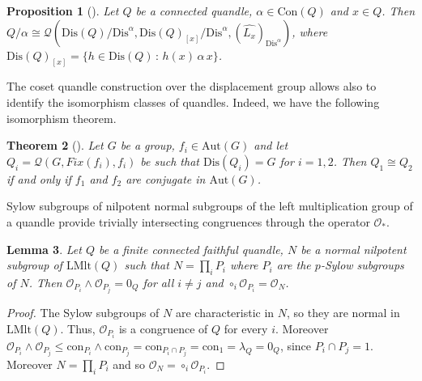 \documentclass[a4paper, english, 9pt]{amsart}
\theoremstyle{plain}
\newtheorem{theorem}{Theorem}[section]
\newtheorem{lemma}[theorem]{Lemma}
\newtheorem{proposition}[theorem]{Proposition}
\theoremstyle{definition}
\def\aut#1{\mathrm{Aut}(#1)}
\def\lmlt{\mathrm{LMlt}}
\def\dis{\mathrm{Dis}}
\def\con{\mathrm{Con}}
\def\c#1{\mathrm{con}_{#1}}
\def\setof#1#2{\{#1\,\colon\,#2\}}
\begin{document}
\begin{proposition}[]
    Let $Q$ be a connected quandle, $\alpha\in \con(Q)$ and $x\in Q$. Then $Q/\alpha\cong \mathcal{Q}(\dis(Q)/\dis^\alpha,\dis(Q)_{[x]}/\dis^\alpha ,\left(\widehat{L_x}\right)_{\dis^\alpha})$, where $\dis(Q)_{[x]}=\setof{h\in \dis(Q)}{h(x)\, \alpha\, x}$.
\end{proposition}


The coset quandle construction over the displacement group allows also to identify the isomorphism classes of quandles. Indeed, we have the following isomorphism theorem. 
\begin{theorem}[] \label{iso theo}
    Let $G$ be a group, $f_i\in \aut{G}$ and let $Q_i=\mathcal{Q}(G,Fix(f_i),f_i)$ be such that $\dis(Q_i)=G$ for $i=1,2$. Then $Q_1\cong Q_2$ if and only if $f_1$ and $f_2$ are conjugate in $\aut{G}$.
\end{theorem}



Sylow subgroups of nilpotent normal subgroups of the left multiplication group of a quandle provide trivially intersecting congruences through the operator $\mathcal{O}_*$.
\begin{lemma}\label{Sylow}
    Let $Q$ be a finite connected faithful quandle, $N$ be a normal nilpotent subgroup of $\lmlt(Q)$ such that $N=\prod_i P_i$ where $P_i$ are the $p$-Sylow subgroups of $N$. Then $ \mathcal{O}_{P_i}\wedge \mathcal{O}_{P_j}=0_Q$ for all $i\neq j$ and $\circ_{i} \mathcal{O}_{P_i}=\mathcal{O}_N$.
\end{lemma}

\begin{proof}

The Sylow subgroups of $N$ are characteristic in $N$, so they are normal in $\lmlt(Q)$. Thus, $\mathcal{O}_{P_i}$ is a congruence of $Q$ for every $i$. Moreover $\mathcal{O}_{P_i}\wedge \mathcal{O}_{P_j}\leq \c{P_i}\wedge \c{P_j}=\c{P_i\cap P_j}=\c{1}=\lambda_Q=0_Q$, since $P_i\cap P_j=1$. 
%
     Moreover $N=\prod_i P_i$ and so $\mathcal{O}_N=\circ_i \mathcal{O}_{P_i}$.
\end{proof}
\end{document}
